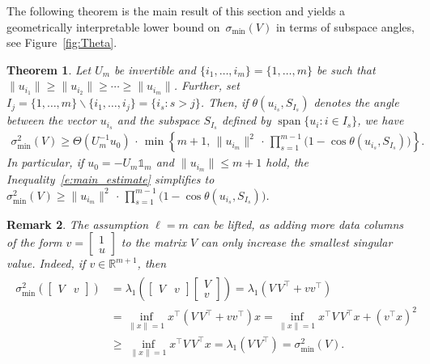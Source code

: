 \documentclass[a4paper, reqno]{amsart}
\newcommand{\R}{\ensuremath{\mathbb R}}
\newcommand{\dd}{\ell}
\newcommand{\one}{\mathds{1}}
\newtheorem{theorem}{Theorem}[section]
\newtheorem{remark}[theorem]{Remark}
\begin{document}
The following theorem is the main result of this section and yields a geometrically interpretable lower bound on~$\sigma_\mathrm{min}(V)$ in terms of subspace angles, see Figure~\ref{fig:Theta}.
\begin{theorem}\label{t:main}
    Let $U_m$ be invertible and $\{i_1,\ldots,i_m\} = \{1,\dots,m\}$ be such that $\|u_{i_1}\|\ge\|u_{i_2}\|\ge\cdots\ge\|u_{i_m}\|$. Further, set $I_j = \{1,\dots,m\}\backslash\{i_1,\ldots,i_j\} = \{i_s : s>j\}$. Then, if $\theta(u_{i_s},S_{I_s})$ denotes the angle between the vector $u_{i_s}$ and the subspace $S_{I_s}$ defined by $\operatorname{span}\{u_i : i\in I_s\}$, we have
    \begin{align}\label{e:main_estimate}
        \sigma_\mathrm{min}^2(V) \ge \Theta(U_m^{-1}u_0)\,\cdot\,\min\left\{m+1,\,\|u_{i_m}\|^{2}\,\cdot\,\prod_{s=1}^{m-1}\big(1 - \cos\theta(u_{i_s},S_{I_s})\big)\right\}.
    \end{align}
    In particular, if $u_0 = -U_m\one_m$ and $\|u_{i_m}\|\le m+1$ hold, the Inequality~\eqref{e:main_estimate} simplifies to $\sigma_\mathrm{min}^2(V)\ge\|u_{i_m}\|^{2}\,\cdot\,\prod_{s=1}^{m-1}\big(1 - \cos\theta(u_{i_s},S_{I_s})\big)$.
\end{theorem}
\begin{remark}\label{rem:extending_V}
    The assumption $\dd=m$ can be lifted, as adding more data columns of the form $v = \left[\begin{smallmatrix}1\\u\end{smallmatrix}\right]$ to the matrix $V$ can only increase the smallest singular value. Indeed, if $v\in\R^{m+1}$, then
    \begin{align}
    \begin{split}\label{eq:increse:singular:value}
        \sigma_\mathrm{min}^2(\begin{bmatrix}V & v\end{bmatrix})
    &= \lambda_{1}\left(\begin{bmatrix}V & v\end{bmatrix}\begin{bmatrix}
        V\\v
    \end{bmatrix}\right) = \lambda_{1}(V\,V^\top + vv^\top) \\
    &= \inf_{\|x\|=1}x^\top(V\,V^\top + vv^\top)x
    = \inf_{\|x\|=1}x^\top V\,V^\top x + (v^\top x)^2\,\\
    &\ge\,\inf_{\|x\|=1}x^\top V\,V^\top x = \lambda_{1}(V\,V^\top) = \sigma_\mathrm{min}^2(V).
    \end{split}
    \end{align}    
\end{remark}
\end{document}
